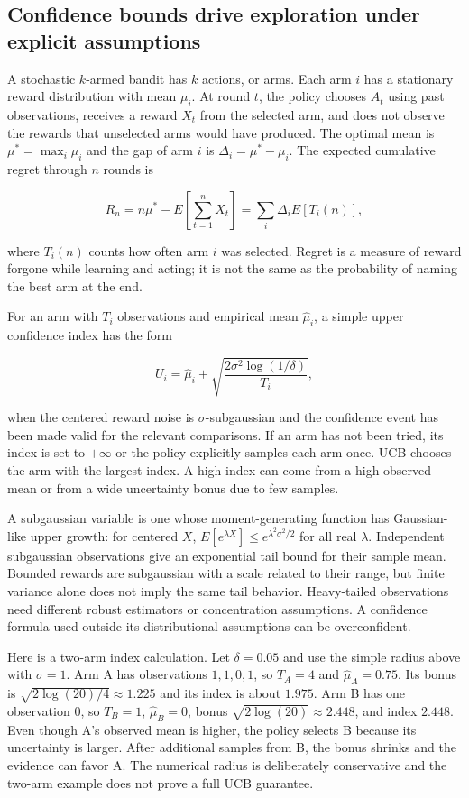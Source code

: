 \subsection{Confidence bounds drive exploration under explicit assumptions}\label{02-foundations-ii-ch029-confidence-bounds-drive-exploration-under-explicit-assumptions}

A stochastic \(k\)-armed bandit has \(k\) actions, or arms. Each arm \(i\) has a stationary reward distribution with mean \(\mu_i\). At round \(t\), the policy chooses \(A_t\) using past observations, receives a reward \(X_t\) from the selected arm, and does not observe the rewards that unselected arms would have produced. The optimal mean is \(\mu^*=\max_i\mu_i\) and the gap of arm \(i\) is \(\Delta_i=\mu^*-\mu_i\). The expected cumulative regret through \(n\) rounds is

\[
R_n=n\mu^*-E\left[\sum_{t=1}^n X_t\right]
=\sum_i\Delta_i E[T_i(n)],
\]

where \(T_i(n)\) counts how often arm \(i\) was selected. Regret is a measure of reward forgone while learning and acting; it is not the same as the probability of naming the best arm at the end.

For an arm with \(T_i\) observations and empirical mean \(\hat\mu_i\), a simple upper confidence index has the form

\[
U_i=\hat\mu_i+\sqrt{\frac{2\sigma^2\log(1/\delta)}{T_i}},
\]

when the centered reward noise is \(\sigma\)-subgaussian and the confidence event has been made valid for the relevant comparisons. If an arm has not been tried, its index is set to \(+\infty\) or the policy explicitly samples each arm once. UCB chooses the arm with the largest index. A high index can come from a high observed mean or from a wide uncertainty bonus due to few samples.

A subgaussian variable is one whose moment-generating function has Gaussian-like upper growth: for centered \(X\), \(E[e^{\lambda X}]\le e^{\lambda^2\sigma^2/2}\) for all real \(\lambda\). Independent subgaussian observations give an exponential tail bound for their sample mean. Bounded rewards are subgaussian with a scale related to their range, but finite variance alone does not imply the same tail behavior. Heavy-tailed observations need different robust estimators or concentration assumptions. A confidence formula used outside its distributional assumptions can be overconfident.

Here is a two-arm index calculation. Let \(\delta=0.05\) and use the simple radius above with \(\sigma=1\). Arm A has observations \(1,1,0,1\), so \(T_A=4\) and \(\hat\mu_A=0.75\). Its bonus is \(\sqrt{2\log(20)/4}\approx1.225\) and its index is about \(1.975\). Arm B has one observation \(0\), so \(T_B=1\), \(\hat\mu_B=0\), bonus \(\sqrt{2\log(20)}\approx2.448\), and index \(2.448\). Even though A's observed mean is higher, the policy selects B because its uncertainty is larger. After additional samples from B, the bonus shrinks and the evidence can favor A. The numerical radius is deliberately conservative and the two-arm example does not prove a full UCB guarantee.

